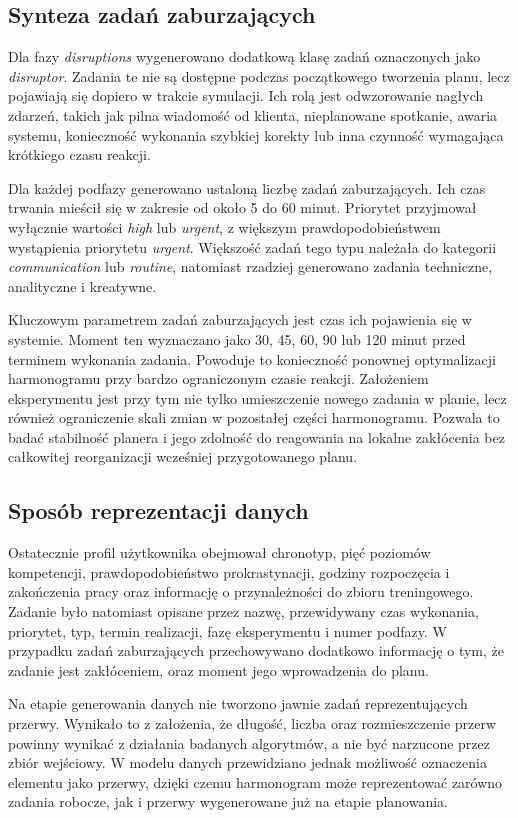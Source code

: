 \subsection{Synteza zadań zaburzających}

Dla fazy \textit{disruptions} wygenerowano dodatkową klasę zadań oznaczonych jako \textit{disruptor}. Zadania te nie są dostępne podczas początkowego tworzenia planu, lecz pojawiają się dopiero w trakcie symulacji. Ich rolą jest odwzorowanie nagłych zdarzeń, takich jak pilna wiadomość od klienta, nieplanowane spotkanie, awaria systemu, konieczność wykonania szybkiej korekty lub inna czynność wymagająca krótkiego czasu reakcji.

Dla każdej podfazy generowano ustaloną liczbę zadań zaburzających. Ich czas trwania mieścił się w zakresie od około 5 do 60 minut. Priorytet przyjmował wyłącznie wartości \textit{high} lub \textit{urgent}, z większym prawdopodobieństwem wystąpienia priorytetu \textit{urgent}. Większość zadań tego typu należała do kategorii \textit{communication} lub \textit{routine}, natomiast rzadziej generowano zadania techniczne, analityczne i kreatywne.

Kluczowym parametrem zadań zaburzających jest czas ich pojawienia się w systemie. Moment ten wyznaczano jako 30, 45, 60, 90 lub 120 minut przed terminem wykonania zadania. Powoduje to konieczność ponownej optymalizacji harmonogramu przy bardzo ograniczonym czasie reakcji. Założeniem eksperymentu jest przy tym nie tylko umieszczenie nowego zadania w planie, lecz również ograniczenie skali zmian w pozostałej części harmonogramu. Pozwala to badać stabilność planera i jego zdolność do reagowania na lokalne zakłócenia bez całkowitej reorganizacji wcześniej przygotowanego planu.

\subsection{Sposób reprezentacji danych}

Ostatecznie profil użytkownika obejmował chronotyp, pięć poziomów kompetencji, prawdopodobieństwo prokrastynacji, godziny rozpoczęcia i zakończenia pracy oraz informację o przynależności do zbioru treningowego. Zadanie było natomiast opisane przez nazwę, przewidywany czas wykonania, priorytet, typ, termin realizacji, fazę eksperymentu i numer podfazy. W przypadku zadań zaburzających przechowywano dodatkowo informację o tym, że zadanie jest zakłóceniem, oraz moment jego wprowadzenia do planu.

Na etapie generowania danych nie tworzono jawnie zadań reprezentujących przerwy. Wynikało to z założenia, że długość, liczba oraz rozmieszczenie przerw powinny wynikać z działania badanych algorytmów, a nie być narzucone przez zbiór wejściowy. W modelu danych przewidziano jednak możliwość oznaczenia elementu jako przerwy, dzięki czemu harmonogram może reprezentować zarówno zadania robocze, jak i przerwy wygenerowane już na etapie planowania.